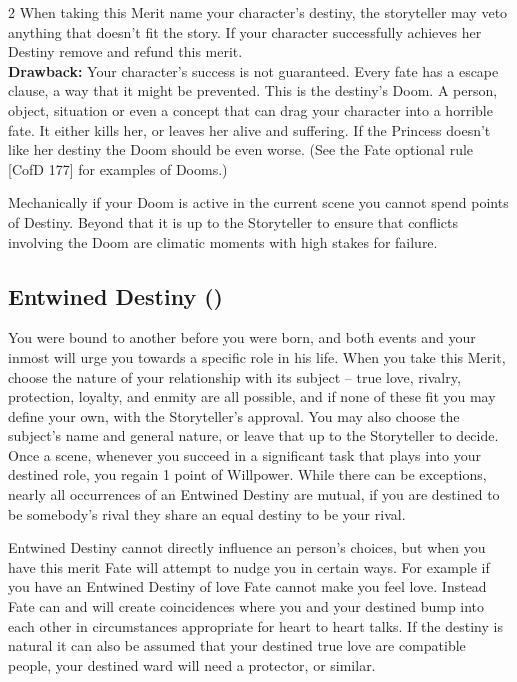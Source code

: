 \begin{multicols}{2}
When taking this Merit name your character's destiny, the storyteller may veto anything that doesn't fit the story. If your character successfully achieves her Destiny remove and refund this merit.\\

\noindent \textbf{Drawback:} Your character's success is not guaranteed. Every fate has a escape clause, a way that it might be prevented. This is the destiny's Doom. A person, object, situation or even a concept that can drag your character into a horrible fate. It either kills her, or leaves her alive and suffering. If the Princess doesn't like her destiny the Doom should be even worse. (See the Fate optional rule [CofD 177] for examples of Dooms.) 

Mechanically if your Doom is active in the current scene you cannot spend points of Destiny. Beyond that it is up to the Storyteller to ensure that conflicts involving the Doom are climatic moments with high stakes for failure.

\subsection*{Entwined Destiny (\textbullet\textbullet\textbullet)}

You were bound to another before you were born, and both events and your inmost will urge you towards a specific role in his life. When you take this Merit, choose the nature of your relationship with its subject -- true love, rivalry, protection, loyalty, and enmity are all possible, and if none of these fit you may define your own, with the Storyteller's approval. You may also choose the subject's name and general nature, or leave that up to the Storyteller to decide. Once a scene, whenever you succeed in a significant task that plays into your destined role, you regain 1 point of Willpower. While there can be exceptions, nearly all occurrences of an Entwined Destiny are mutual, if you are destined to be somebody's rival they share an equal destiny to be your rival. 

Entwined Destiny cannot directly influence an person's choices, but when you have this merit Fate will attempt to nudge you in certain ways. For example if you have an Entwined Destiny of love Fate cannot make you feel love. Instead Fate can and will create coincidences where you and your destined bump into each other in circumstances appropriate for heart to heart talks. If the destiny is natural it can also be assumed that your destined true love are compatible people, your destined ward will need a protector, or similar.


\end{multicols}
